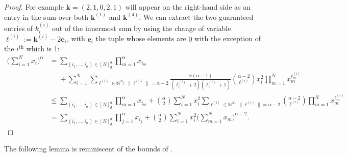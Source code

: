 \documentclass[a4paper,11pt]{article}
\theoremstyle{definition}
\newcommand{\bbN}{\mathbb{N}}
\newcommand{\bfk}{\mathbf{k}}
\newcommand{\bfl}{\bm{\ell}}
\newcommand{\bfe}{\mathbf{e}}
\begin{document}
\begin{proof}
For example $\bfk = (2,1,0,2,1)$ will appear on the right-hand side as an entry in the sum over both $\bfk^{(1)}$ and $\bfk^{(4)}$.
We can extract the two guaranteed entries of $k_i^{(i)}$ out of the innermost sum by using the change of variable $\bfl^{(i)} := \bfk^{(i)} - 2\bfe_i$, with $\bfe_i$ the tuple whose elements are $0$ with the exception of the $i^{\textrm{th}}$ which is 1:
\begin{align*}
\Bigg(\sum_{i=1}^N x_i\Bigg)^\alpha &= \sum_{ ( i_1,\dots,i_\alpha ) \in [ N ]_d^{ \alpha } } \prod_{m=1}^\alpha x_{i_m} \\
&\phantom{=} + \sum_{i=1}^N \sum_{\bfl^{(i)} \in \bbN^N:\:\| \bfl^{(i)}\| = \alpha-2} \frac{\alpha(\alpha-1)}{(\ell^{(i)}_i + 2)(\ell^{(i)}_i+1)}\binom{\alpha-2}{\bfl^{(i)}} x_i^2 \prod_{m=1}^N x_m^{\ell^{(i)}_m}\\
&\leq \sum_{ ( i_1,\dots,i_\alpha ) \in [ N ]_d^{ \alpha } } \prod_{m=1}^\alpha x_{i_m} + \binom{\alpha}{2}\sum_{i=1}^N x_i^2 \sum_{\bfl^{(i)} \in \bbN^N:\:\| \bfl^{(i)}\| = \alpha-2} \binom{\alpha-2}{\bfl^{(i)}} \prod_{m=1}^N x_m^{\ell^{(i)}_m}\\
&= \sum_{ ( i_1,\dots,i_\alpha ) \in [ N ]_d^{ \alpha } } \prod_{j=1}^\alpha x_{i_j} + \binom{\alpha}{2}\sum_{i=1}^N x_i^2  \Bigg(\sum_{m=1}^N x_m\Bigg)^{\alpha-2}.
\end{align*}
\end{proof}

The following lemma is reminiscent of the bounds of \cite[pages 442--443]{mohle1998}.
\end{document}
